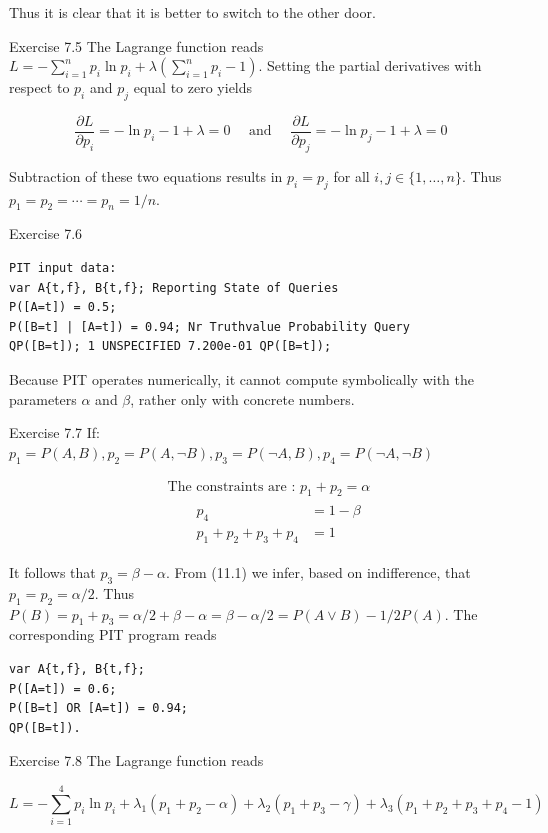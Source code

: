 \documentclass[10pt]{book}
\begin{document}
Thus it is clear that it is better to switch to the other door.

Exercise 7.5 The Lagrange function reads $L=-\sum_{i=1}^{n} p_{i} \ln p_{i}+\lambda\left(\sum_{i=1}^{n} p_{i}-1\right)$. Setting the partial derivatives with respect to $p_{i}$ and $p_{j}$ equal to zero yields

$$
\frac{\partial L}{\partial p_{i}}=-\ln p_{i}-1+\lambda=0 \quad \text { and } \quad \frac{\partial L}{\partial p_{j}}=-\ln p_{j}-1+\lambda=0
$$

Subtraction of these two equations results in $p_{i}=p_{j}$ for all $i, j \in\{1, \ldots, n\}$. Thus $p_{1}=p_{2}=\cdots=p_{n}=1 / n$.

Exercise 7.6
\begin{verbatim}
PIT input data:
var A{t,f}, B{t,f}; Reporting State of Queries
P([A=t]) = 0.5;
P([B=t] | [A=t]) = 0.94; Nr Truthvalue Probability Query
QP([B=t]); 1 UNSPECIFIED 7.200e-01 QP([B=t]);
\end{verbatim}

Because PIT operates numerically, it cannot compute symbolically with the parameters $\alpha$ and $\beta$, rather only with concrete numbers.

Exercise 7.7
If: $p_{1}=P(A, B), p_{2}=P(A, \neg B), p_{3}=P(\neg A, B), p_{4}=P(\neg A, \neg B)$


\begin{align*}
& \text { The constraints are : } p_{1}+p_{2}=\alpha  \tag{11.1}\\
& \qquad \begin{aligned}
p_{4} & =1-\beta \\
p_{1}+p_{2}+p_{3}+p_{4} & =1
\end{aligned} \tag{11.2}
\end{align*}


It follows that $p_{3}=\beta-\alpha$. From (11.1) we infer, based on indifference, that $p_{1}=p_{2}=\alpha / 2$. Thus $P(B)=p_{1}+p_{3}=\alpha / 2+\beta-\alpha=\beta-\alpha / 2=P(A \vee B)-1 / 2 P(A)$. The corresponding PIT program reads

\begin{verbatim}
var A{t,f}, B{t,f};
P([A=t]) = 0.6;
P([B=t] OR [A=t]) = 0.94;
QP([B=t]).
\end{verbatim}

Exercise 7.8 The Lagrange function reads


\begin{equation*}
L=-\sum_{i=1}^{4} p_{i} \ln p_{i}+\lambda_{1}\left(p_{1}+p_{2}-\alpha\right)+\lambda_{2}\left(p_{1}+p_{3}-\gamma\right)+\lambda_{3}\left(p_{1}+p_{2}+p_{3}+p_{4}-1\right) \tag{11.4}
\end{equation*}
\end{document}

